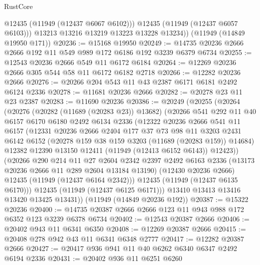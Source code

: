 \begin{lexlean}{RustCore}
\begin{coremodule}
            @12435
            (@11949 (@12437 @6067 @6102)))
          @12435
          (@11949 (@12437 @6057 @6103)))
        @13213
        @13216
        @13219
        @13223
        @13228
        @13234))
    (@11949 (@14849 @19950 @171))
@20236 := @15168 @19950
@20249 := @14735 @20236 @2666 @2666 @192 @11 @549 @989 @172 @6186 @192 @3239 @6379 @6734
@20255 := @12543 @20236 @2666 @549 @11 @6172 @6184
@20264 := @12269 @20236 @2666 @305 @544 @58 @11 @6172 @6182 @2718
@20266 := @12282 @20236 @2666
@20276 := @20266 @204 @543 @11 @43 @2387 @6171 @6181 @2492 @6124 @2336
@20278 := @11681 @20236 @2666
@20282 := @20278 @23 @11 @23 @2387
@20283 := @11690 @20236
@20386 := @20249
    (@20255
      (@20264
        (@20276
          (@20282 (@11689 (@20283 @23)) @13682)
          (@20266
            @541
            @292
            @11
            @40
            @6157
            @6170
            @6180
            @2492
            @6134
            @2336
            (@12322
              @20236
              @2666
              @541
              @11
              @6157
              (@12331
                @20236
                @2666
                @2404
                @177
                @37
                @73
                @98
                @11
                @3203
                @2431
                @6142
                @6152
                (@20278 @159 @38 @159 @3203 (@11689 (@20283 @159)) @14684)
                @12382
                @12390
                @13150
                @12411
                (@11949 (@12413 @6152 @6143))
                @12423))
            (@20266
              @290
              @214
              @11
              @27
              @2604
              @2342
              @2397
              @2492
              @6163
              @2336
              (@13173 @20236 @2666 @11 @289 @2604 @13184 @13190)
              (@12430 @20236 @2666)
              @12435
              (@11949 (@12437 @6164 @2342)))
            @12435
            (@11949 (@12437 @6135 @6170)))
          @12435
          (@11949 (@12437 @6125 @6171)))
        @13410
        @13413
        @13416
        @13420
        @13425
        @13431))
    (@11949 (@14849 @20236 @192))
@20387 := @15322 @20236
@20400 := @14735 @20387 @2666 @2666 @123 @11 @943 @988 @172 @6352 @123 @3239 @6378 @6734
@20402 := @12543 @20387 @2666
@20406 := @20402 @943 @11 @6341 @6350
@20408 := @12269 @20387 @2666
@20415 := @20408 @278 @942 @43 @11 @6341 @6348 @2777
@20417 := @12282 @20387 @2666
@20427 := @20417 @936 @941 @11 @40 @6262 @6340 @6347 @2492 @6194 @2336
@20431 := @20402 @936 @11 @6251 @6260

\end{coremodule}
\end{lexlean}
